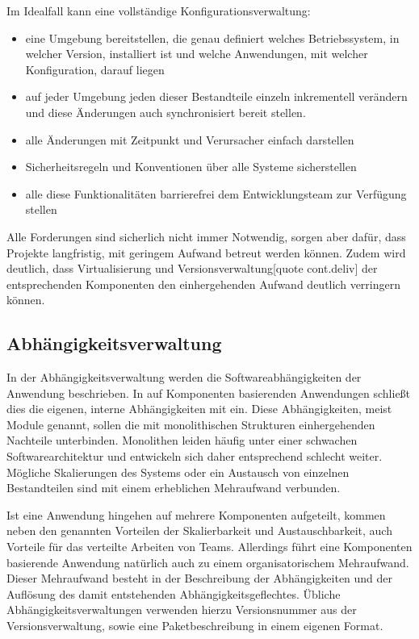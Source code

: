 Im Idealfall kann eine vollständige Konfigurationsverwaltung:
\begin{itemize}
\item eine Umgebung bereitstellen, die genau definiert welches Betriebssystem, in welcher Version, installiert ist und welche Anwendungen, mit welcher Konfiguration, darauf liegen
\item auf jeder Umgebung jeden dieser Bestandteile einzeln inkrementell verändern und diese Änderungen auch synchronisiert bereit stellen.
\item alle Änderungen mit Zeitpunkt und Verursacher einfach darstellen
\item Sicherheitsregeln und Konventionen über alle Systeme sicherstellen
\item alle diese Funktionalitäten barrierefrei dem Entwicklungsteam zur Verfügung stellen
\end{itemize}

Alle Forderungen sind sicherlich nicht immer Notwendig, sorgen aber dafür, dass Projekte langfristig, mit geringem Aufwand betreut werden können. Zudem wird deutlich, dass Virtualisierung und Versionsverwaltung[quote cont.deliv] der entsprechenden Komponenten den einhergehenden Aufwand deutlich verringern können.

\subsection{Abhängigkeitsverwaltung}

In der Abhängigkeitsverwaltung werden die Softwareabhängigkeiten der Anwendung beschrieben. In auf  Komponenten basierenden Anwendungen schließt dies die eigenen, interne Abhängigkeiten mit ein. Diese Abhängigkeiten, meist Module genannt, sollen die mit monolithischen Strukturen einhergehenden Nachteile unterbinden. Monolithen leiden häufig unter einer schwachen Softwarearchitektur und entwickeln sich daher entsprechend schlecht weiter. Mögliche Skalierungen des Systems oder ein Austausch von einzelnen Bestandteilen sind mit einem erheblichen Mehraufwand verbunden.

Ist eine Anwendung hingehen auf mehrere Komponenten aufgeteilt, kommen neben den genannten Vorteilen der Skalierbarkeit und Austauschbarkeit, auch Vorteile für das verteilte Arbeiten von Teams. Allerdings führt eine Komponenten basierende Anwendung natürlich auch zu einem organisatorischem Mehraufwand. Dieser Mehraufwand besteht in der Beschreibung der Abhängigkeiten und der Auflösung des damit entstehenden Abhängigkeitsgeflechtes. Übliche Abhängigkeitsverwaltungen verwenden hierzu Versionsnummer aus der Versionsverwaltung, sowie eine Paketbeschreibung in einem eigenen Format. 

